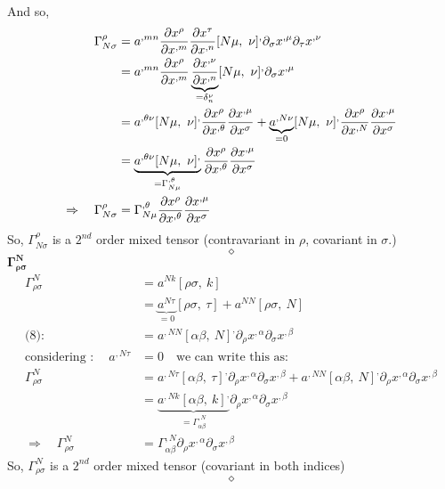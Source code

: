 And so,
\begin{align}
 \Gamma^{\rho}_{N \sigma} &=a^{,mn}\pdv{x^{\rho}}{x^{,m}}\pdv{x^{\tau}}{x^{,n}}[ N \mu, \ \nu]^{,}\partial_{\sigma}x^{,\mu}\partial_{\tau}x^{,\nu}\\
\ &=a^{,mn}\pdv{x^{\rho}}{x^{,m}}\underbrace{\pdv{x^{,\nu}}{x^{,n}}}_{= \delta^{\nu}_{n}}[ N \mu, \ \nu]^{,}\partial_{\sigma}x^{,\mu}\\
\ &=a^{,\theta \nu }[ N \mu, \ \nu]^{,}\pdv{x^{\rho}}{x^{,\theta}}\pdv{x^{,\mu}}{x^{\sigma}}+ \underbrace{a^{,N \nu }}_{=0}[ N \mu, \ \nu]^{,}\pdv{x^{\rho}}{x^{,N}}\pdv{x^{,\mu}}{x^{\sigma}}\\
\ &=\underbrace{a^{,\theta \nu }[ N \mu, \ \nu]^{,}}_{ = \Gamma^{,\theta}_{N\mu}}\pdv{x^{\rho}}{x^{,\theta}}\pdv{x^{,\mu}}{x^{\sigma}}\\
\Rightarrow \quad \Gamma^{\rho}_{N \sigma} &=  \Gamma^{,\theta}_{N\mu}\pdv{x^{\rho}}{x^{,\theta}}\pdv{x^{,\mu}}{x^{\sigma}}
\end{align}
So, $\Gamma^{\rho}_{N \sigma}$ is a $2^{nd}$ order mixed tensor (contravariant in $\rho$, covariant in $\sigma$.)
$$\diamond$$
$\boldsymbol{\Gamma^{N }_{\rho \sigma}}$\\
\begin{align}
\Gamma^{N }_{\rho \sigma} &= a^{N  k}[\rho \sigma,\ k]\\
\ & = \underbrace{a^{N \tau}}_{=0}[\rho \sigma,\ \tau]+ a^{N N}[\rho \sigma,\ N]\\
\text{(8):}\quad &= a^{,NN}[\alpha \beta, \ N]^{,}\partial_{\rho}x^{,\alpha}\partial_{\sigma}x^{,\beta}\\
\text{considering :}\quad \ a^{,N \tau} & =0 \quad \text{we can write this as:}\\
\Gamma^{N }_{\rho \sigma} &=a^{,N \tau}[\alpha \beta, \ \tau]^{,}\partial_{\rho}x^{,\alpha}\partial_{\sigma}x^{,\beta}+ a^{,NN}[\alpha \beta, \ N]^{,}\partial_{\rho}x^{,\alpha}\partial_{\sigma}x^{,\beta}\\
\ &=\underbrace{a^{,N k}[\alpha \beta, \ k]^{,}}_{= \Gamma^{,N}_{\alpha \beta}}\partial_{\rho}x^{,\alpha}\partial_{\sigma}x^{,\beta}\\
\Rightarrow \quad \Gamma^{N }_{\rho \sigma} &= \Gamma^{,N}_{\alpha \beta}\partial_{\rho}x^{,\alpha}\partial_{\sigma}x^{,\beta}
\end{align}
So, $\Gamma^{N }_{\rho \sigma}$ is a $2^{nd}$ order mixed tensor (covariant in both indices)
$$\diamond$$

